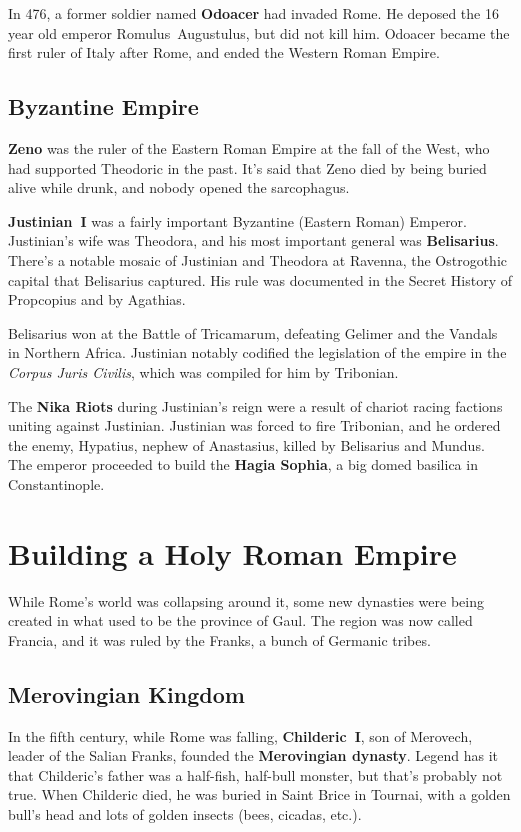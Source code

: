 In 476, a former soldier named \textbf{Odoacer} had invaded Rome.
He deposed the 16 year old emperor Romulus~Augustulus, but did not kill him.
Odoacer became the first ruler of Italy after Rome, and ended the Western Roman Empire.

\subsection*{Byzantine Empire}

\textbf{Zeno} was the ruler of the Eastern Roman Empire at the fall of the West,
who had supported Theodoric in the past.
It's said that Zeno died by being buried alive while drunk, and nobody opened the sarcophagus.

\textbf{Justinian~I} was a fairly important Byzantine (Eastern Roman) Emperor.
Justinian's wife was Theodora, and his most important general was \textbf{Belisarius}.
There's a notable mosaic of Justinian and Theodora at Ravenna,
the Ostrogothic capital that Belisarius captured.
His rule was documented in the Secret History of Propcopius and by Agathias.

Belisarius won at the Battle of Tricamarum, defeating Gelimer and the Vandals in Northern Africa.
Justinian notably codified the legislation of the empire in the \textit{Corpus Juris Civilis},
which was compiled for him by Tribonian.

The \textbf{Nika Riots} during Justinian's reign were a result of chariot racing factions uniting against Justinian.
Justinian was forced to fire Tribonian,
and he ordered the enemy, Hypatius, nephew of Anastasius, killed by Belisarius and Mundus.
The emperor proceeded to build the \textbf{Hagia Sophia}, a big domed basilica in Constantinople.

\section{Building a Holy Roman Empire}

While Rome's world was collapsing around it, some new dynasties were being created
in what used to be the province of Gaul.
The region was now called Francia, and it was ruled by the Franks, a bunch of Germanic tribes.

\subsection*{Merovingian Kingdom}

In the fifth century, while Rome was falling,
\textbf{Childeric~I}, son of Merovech, leader of the Salian Franks, founded the \textbf{Merovingian dynasty}.
Legend has it that Childeric's father was a half-fish, half-bull monster, but that's probably not true.
When Childeric died, he was buried in Saint Brice in Tournai,
with a golden bull's head and lots of golden insects (bees, cicadas, etc.).

